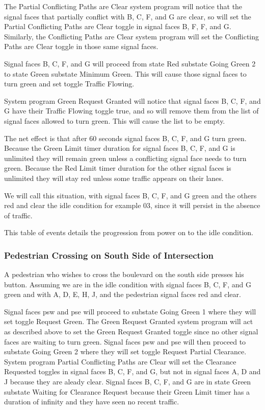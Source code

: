 \documentclass[letterpaper,twoside]{article}
\begin{document}
The Partial Conflicting Paths are Clear system program will notice that the
signal faces that partially conflict with B, C, F, and G are clear,
so will set the
Partial Conflicting Paths are Clear toggle in signal faces B, F, F, and G.
Similarly, the Conflicting Paths are Clear system program will set
the Conflicting Paths are Clear toggle in those same signal faces.

Signal faces B, C, F, and G will proceed from state Red substate
Going Green 2 to state Green substate Minimum Green.
This will cause those signal faces to turn green and set toggle
Traffic Flowing.

System program Green Request Granted will notice that signal faces
B, C, F, and G have their Traffic Flowing toggle true,
and so will remove them from the list of signal faces allowed to turn green.
This will cause the list to be empty.

The net effect is that after 60 seconds signal faces
B, C, F, and G turn green.  Because the Green Limit timer duration for signal
faces B, C, F, and G is unlimited they will remain green unless
a conflicting signal face needs to turn green.  Because the Red Limit
timer duration for the other signal faces is unlimited they will stay red
unless some traffic appears on their lanes.

We will call this situation, with signal faces B, C, F, and G green
and the others red and clear the idle condition for example 03,
since it will persist in the absence of traffic.

This table of events details the progression from power on to the idle
condition.



\subsubsection{Pedestrian Crossing on South Side of Intersection}
A pedestrian who wishes to cross the boulevard on the south side
presses his button.  Assuming we are in the idle condition
with signal faces B, C, F, and G green and with A, D, E, H, J,
and the pedestrian signal faces red and clear.

Signal faces psw and pse will proceed to substate Going Green 1 where
they will set
toggle Request Green.  The Green Request Granted system program will act
as described above to set the Green Request Granted toggle since no other
signal faces are waiting to turn green.  Signal faces psw and pse will then
proceed to substate Going Green 2 where they will set toggle Request Partial
Clearance.  System program Partial Conflicting Paths are Clear will set
the Clearance Requested toggles in signal faces B, C, F, and G,
but not in signal faces A, D and J because they are aleady clear.
Signal faces B, C, F, and G are in state Green substate Waiting for Clearance
Request because their Green Limit timer has a duration of infinity and
they have seen no recent traffic.
\end{document}

